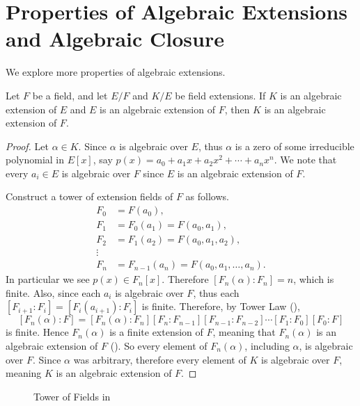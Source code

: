 \section{Properties of Algebraic Extensions and Algebraic Closure}
We explore more properties of algebraic extensions.
\begin{theorem}\label{thrm-algebraic-over-algebraic-is-algebraic}
    Let $F$ be a field, and let $E/F$ and $K/E$ be field extensions. If $K$ is an algebraic extension of $E$ and $E$ is an algebraic extension of $F$, then $K$ is an algebraic extension of $F$.
\end{theorem}
\begin{proof}
    Let $\alpha \in K$. Since $\alpha$ is algebraic over $E$, thus $\alpha$ is a zero of some irreducible polynomial in $E[x]$, say $p(x) = a_0 + a_1x + a_2x^2 + \cdots + a_nx^n$. We note that every $a_i \in E$ is algebraic over $F$ since $E$ is an algebraic extension of $F$.

    Construct a tower of extension fields of $F$ as follows.
    \begin{align*}
        F_0 &= F(a_0),\\
        F_1 &= F_0(a_1) = F(a_0, a_1),\\
        F_2 &= F_1(a_2) = F(a_0, a_1, a_2),\\
        \vdots\\
        F_n &= F_{n-1}(a_n) = F(a_0, a_1, \dots, a_n).
    \end{align*}
    In particular we see $p(x) \in F_n[x]$. Therefore $[F_n(\alpha): F_n] = n$, which is finite. Also, since each $a_i$ is algebraic over $F$, thus each $[F_{i+1}:F_i] = [F_i(a_{i+1}):F_i]$ is finite. Therefore, by Tower Law (),
    \[
        [F_n(\alpha):F] = [F_n(\alpha):F_n][F_n:F_{n-1}][F_{n-1}:F_{n-2}]\cdots[F_1:F_0][F_0:F]
    \]
    is finite. Hence $F_n(\alpha)$ is a finite extension of $F$, meaning that $F_n(\alpha)$ is an algebraic extension of $F$ (). So every element of $F_n(\alpha)$, including $\alpha$, is algebraic over $F$. Since $\alpha$ was arbitrary, therefore every element of $K$ is algebraic over $F$, meaning $K$ is an algebraic extension of $F$.
\end{proof}

\begin{figure}[H]
    \centering
    \caption{Tower of Fields in }
\end{figure}

